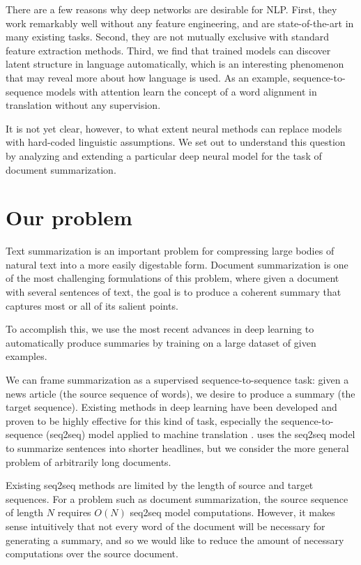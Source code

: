 \documentclass[11pt]{report}
\begin{document}
There are a few reasons why deep networks are desirable for NLP. First, they work remarkably well without any feature engineering, and are state-of-the-art in many existing tasks.
Second, they are not mutually exclusive with standard feature extraction methods.
Third, we find that trained models can discover latent structure in language automatically, which is an interesting phenomenon that may reveal more about how language is used. As an example, sequence-to-sequence models with attention \citep{bahdanau2014neural} learn the concept of a word alignment in translation without any supervision.

It is not yet clear, however, to what extent neural methods can replace models with hard-coded linguistic assumptions. We set out to understand this question by analyzing and extending a particular deep neural model for the task of document summarization.


\section{Our problem}

Text summarization is an important problem for compressing large bodies of natural text into a more easily digestable form. Document summarization is one of the most challenging formulations of this problem, where given a document with several sentences of text, the goal is to produce a coherent summary that captures most or all of its salient points.

To accomplish this, we use the most recent advances in deep learning to automatically produce summaries by training on a large dataset of given examples.

We can frame summarization as a supervised sequence-to-sequence task: given a news article (the source sequence of words), we desire to produce a summary (the target sequence). Existing methods in deep learning have been developed and proven to be highly effective for this kind of task, especially the sequence-to-sequence (seq2seq) model applied to machine translation \citep{sutskever2014sequence, bahdanau2014neural}. \citet{rush2015neural} uses the seq2seq model to summarize sentences into shorter headlines, but we consider the more general problem of arbitrarily long documents.

Existing seq2seq methods are limited by the length of source and target sequences. For a problem such as document summarization, the source sequence of length $N$ requires $O(N)$ seq2seq model computations. However, it makes sense intuitively that not every word of the document will be necessary for generating a summary, and so we would like to reduce the amount of necessary computations over the source document.
\end{document}
